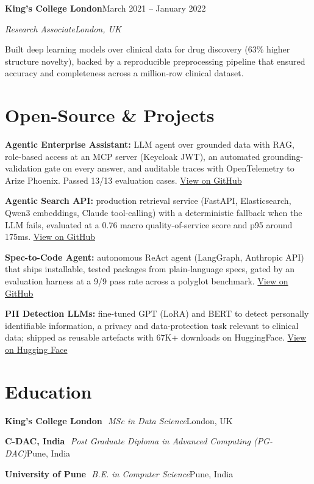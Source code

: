 \documentclass[10pt,a4paper]{article}
\newcommand{\entry}[4]{%
  {\color{company}\bfseries #1}\hfill {\color{muted}#2}\par
  \vspace{1pt}
  {\itshape #3}\hfill {\color{muted}\itshape #4}\par
  \vspace{3pt}%
}
\newcommand{\sep}{\,\textcolor{accent!60}{\textbar}\,}
\begin{document}
\entry{King's College London}{March 2021 -- January 2022}{Research Associate}{London, UK}
\begin{tight}
  \item Built deep learning models over clinical data for drug discovery (63\% higher structure novelty), backed by a reproducible preprocessing pipeline that ensured accuracy and completeness across a million-row clinical dataset.
\end{tight}

\section{Open-Source \& Projects}
\begin{tight}
  \item \textbf{Agentic Enterprise Assistant:} LLM agent over grounded data with RAG, role-based access at an MCP server (Keycloak JWT), an automated grounding-validation gate on every answer, and auditable traces with OpenTelemetry to Arize Phoenix. Passed 13/13 evaluation cases. \href{https://github.com/abhijeetscode/Agentic-Enterprise-Assistant}{View on GitHub}
  \item \textbf{Agentic Search API:} production retrieval service (FastAPI, Elasticsearch, Qwen3 embeddings, Claude tool-calling) with a deterministic fallback when the LLM fails, evaluated at a 0.76 macro quality-of-service score and p95 around 175ms. \href{https://github.com/abhijeetscode/search-agent}{View on GitHub}
  \item \textbf{Spec-to-Code Agent:} autonomous ReAct agent (LangGraph, Anthropic API) that ships installable, tested packages from plain-language specs, gated by an evaluation harness at a 9/9 pass rate across a polyglot benchmark. \href{https://github.com/abhijeetscode/Spec-to-Code-Agent}{View on GitHub}
  \item \textbf{PII Detection LLMs:} fine-tuned GPT (LoRA) and BERT to detect personally identifiable information, a privacy and data-protection task relevant to clinical data; shipped as reusable artefacts with 67K+ downloads on HuggingFace. \href{https://huggingface.co/ab-ai/pii_model}{View on Hugging Face}
\end{tight}

\section{Education}
{\color{company}\bfseries King's College London} \sep {\itshape MSc in Data Science}\hfill {\color{muted}London, UK}\par\vspace{1pt}
{\color{company}\bfseries C-DAC, India} \sep {\itshape Post Graduate Diploma in Advanced Computing (PG-DAC)}\hfill {\color{muted}Pune, India}\par\vspace{1pt}
{\color{company}\bfseries University of Pune} \sep {\itshape B.E. in Computer Science}\hfill {\color{muted}Pune, India}\par
\end{document}
